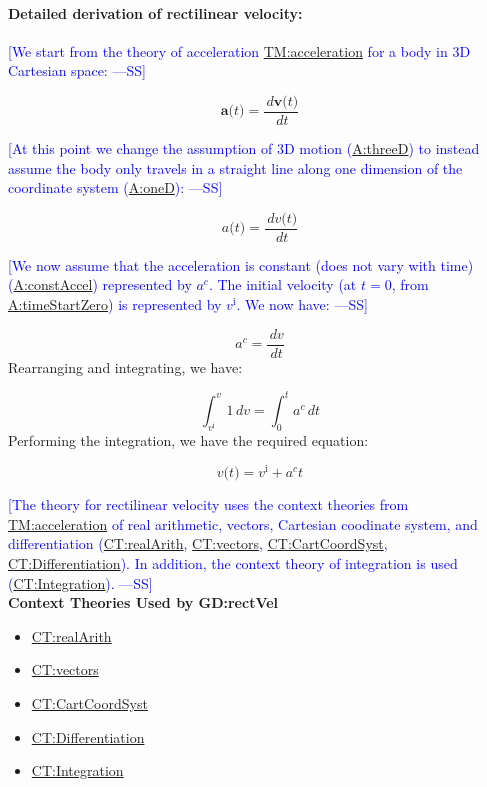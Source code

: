 \documentclass[12pt]{article}
\newcommand{\authornote}[3]{\textcolor{#1}{[#3 ---#2]}}
\newcommand{\authornote}[3]{}
\newcommand{\wss}[1]{\authornote{blue}{SS}{#1}}
\begin{document}
\paragraph{Detailed derivation of rectilinear velocity:}
\label{GD:rectVelDeriv}
\wss{We start from the theory of acceleration
\hyperref[TM:acceleration]{TM:acceleration} for a body in 3D Cartesian space:}

$$\symbf{a}\text{(}t\text{)}=\frac{\,d\symbf{v}\text{(}t\text{)}}{\,dt}$$

\wss{At this point we change the assumption of 3D motion
(\hyperref[threeD]{A:threeD}) to instead assume the body only travels in a
straight line along one dimension of the coordinate system
(\hyperref[oneD]{A:oneD}):}

$${a}\text{(}t\text{)}=\frac{\,d{v}\text{(}t\text{)}}{\,dt}$$

\wss{We now assume that the acceleration is constant (does not vary with time)
(\hyperref[constAccel]{A:constAccel}) represented by ${a^{c}}$. The initial
velocity (at $t=0$, from \hyperref[timeStartZero]{A:timeStartZero}) is
represented by ${v^{\text{i}}}$. We now have:}

\begin{displaymath}
{a^{c}}=\frac{\,dv}{\,dt}
\end{displaymath}
Rearranging and integrating, we have:

\begin{displaymath}
\int_{{v^{\text{i}}}}^{v}{1}\,dv=\int_{0}^{t}{{a^{c}}}\,dt
\end{displaymath}
Performing the integration, we have the required equation:

\begin{displaymath}
v\text{(}t\text{)}={v^{\text{i}}}+{a^{c}} t
\end{displaymath}

\wss{The theory for rectilinear velocity uses the context theories from
\hyperref[TM:acceleration]{TM:acceleration} of real arithmetic, vectors,
Cartesian coodinate system, and differentiation
(\hyperref[CT:realArith]{CT:realArith}, \hyperref[CT:vectors]{CT:vectors},
\hyperref[CT:CartCoordSyst]{CT:CartCoordSyst},
\hyperref[CT:Differentiation]{CT:Differentiation}).  In addition, the context
theory of integration is used (\hyperref[CT:Integration]{CT:Integration}).}
~\\

\noindent \textbf{Context Theories Used by GD:rectVel}

\begin{itemize}
\item \hyperref[CT:realArith]{CT:realArith}
\item \hyperref[CT:vectors]{CT:vectors}
\item \hyperref[CT:CartCoordSyst]{CT:CartCoordSyst}
\item \hyperref[CT:Differentiation]{CT:Differentiation}
\item \hyperref[CT:Integration]{CT:Integration}
\end{itemize}
\end{document}
